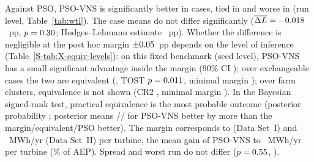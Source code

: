 Against PSO, PSO-VNS is significantly better in \NWtlPSOW{} cases, tied in \NWtlPSOT{} and worse in \NWtlPSOL{} (run level, Table~\ref{tab:wtl}). The case means do not differ significantly ($\overline{\Delta L}=-0.018$~pp, $p=0.30$; Hodges--Lehmann estimate \NXHLPSOVNSvsPSO~pp). Whether the difference is negligible at the post hoc margin $\pm0.05$~pp depends on the level of inference (Table~\ref{S-tab:X-equiv-levels}): on this fixed benchmark (seed level), PSO-VNS has a small significant advantage inside the margin (90\% CI \NXEqSeedPSOVNSvsPSOCI); over exchangeable cases the two are equivalent (\NXEqCasePSOVNSvsPSOCI, TOST $p=0.011$, minimal margin \NXEqCasePSOVNSvsPSOMin); over farm clusters, equivalence is not shown (CR2 \NXEqClustPSOVNSvsPSOCI, minimal margin \NXEqClustPSOVNSvsPSOMin). In the Bayesian signed-rank test, practical equivalence is the most probable outcome (posterior probability \NBayPSOVNSvsPSORope; posterior means \NXBayMeanPSOVNSvsPSOLeft/\NXBayMeanPSOVNSvsPSORope/\NXBayMeanPSOVNSvsPSORight{} for PSO-VNS better by more than the margin/equivalent/PSO better). The margin corresponds to \NXMarginMWhTurbDsI{} (Data Set~I) and \NXMarginMWhTurbDsII~MWh/yr (Data Set~II) per turbine, the mean gain of PSO-VNS to \NXEnPSOVNSvsPSOMWhTurb~MWh/yr per turbine (\NXEnPSOVNSvsPSOPct\% of AEP). Spread and worst run do not differ ($p=0.55$, \NWorstP).

